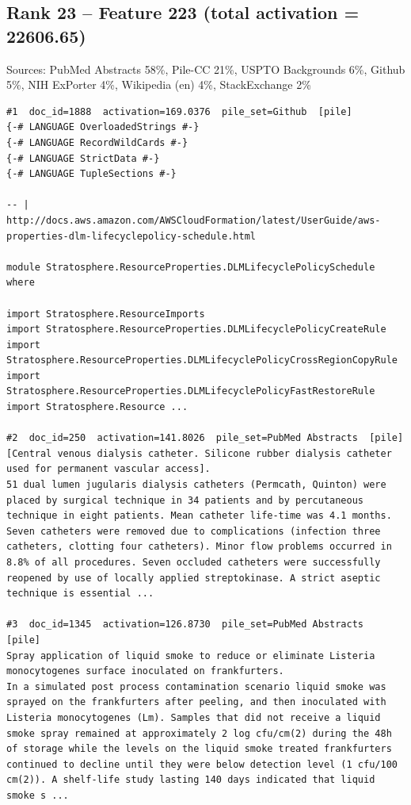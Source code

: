 \subsection*{Rank 23 -- Feature 223 (total activation = 22606.65)}

Sources: PubMed Abstracts 58\%, Pile-CC 21\%, USPTO Backgrounds 6\%, Github 5\%, NIH ExPorter 4\%, Wikipedia (en) 4\%, StackExchange 2\%

\begin{verbatim}
#1  doc_id=1888  activation=169.0376  pile_set=Github  [pile]
{-# LANGUAGE OverloadedStrings #-}
{-# LANGUAGE RecordWildCards #-}
{-# LANGUAGE StrictData #-}
{-# LANGUAGE TupleSections #-}

-- | http://docs.aws.amazon.com/AWSCloudFormation/latest/UserGuide/aws-properties-dlm-lifecyclepolicy-schedule.html

module Stratosphere.ResourceProperties.DLMLifecyclePolicySchedule where

import Stratosphere.ResourceImports
import Stratosphere.ResourceProperties.DLMLifecyclePolicyCreateRule
import Stratosphere.ResourceProperties.DLMLifecyclePolicyCrossRegionCopyRule
import Stratosphere.ResourceProperties.DLMLifecyclePolicyFastRestoreRule
import Stratosphere.Resource ...

#2  doc_id=250  activation=141.8026  pile_set=PubMed Abstracts  [pile]
[Central venous dialysis catheter. Silicone rubber dialysis catheter used for permanent vascular access].
51 dual lumen jugularis dialysis catheters (Permcath, Quinton) were placed by surgical technique in 34 patients and by percutaneous technique in eight patients. Mean catheter life-time was 4.1 months. Seven catheters were removed due to complications (infection three catheters, clotting four catheters). Minor flow problems occurred in 8.8% of all procedures. Seven occluded catheters were successfully reopened by use of locally applied streptokinase. A strict aseptic technique is essential ...

#3  doc_id=1345  activation=126.8730  pile_set=PubMed Abstracts  [pile]
Spray application of liquid smoke to reduce or eliminate Listeria monocytogenes surface inoculated on frankfurters.
In a simulated post process contamination scenario liquid smoke was sprayed on the frankfurters after peeling, and then inoculated with Listeria monocytogenes (Lm). Samples that did not receive a liquid smoke spray remained at approximately 2 log cfu/cm(2) during the 48h of storage while the levels on the liquid smoke treated frankfurters continued to decline until they were below detection level (1 cfu/100 cm(2)). A shelf-life study lasting 140 days indicated that liquid smoke s ...


\end{verbatim}
